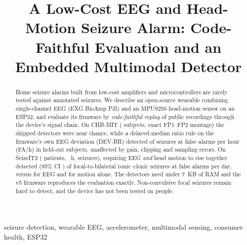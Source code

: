 \documentclass[conference,letterpaper]{IEEEtran}
\begin{document}
\title{A Low-Cost EEG and Head-Motion Seizure Alarm: Code-Faithful Evaluation and an Embedded Multimodal Detector}

\author{
\and
{}
}

\maketitle

\begin{abstract}
Home seizure alarms built from low-cost amplifiers and microcontrollers are rarely tested against annotated seizures. We describe an open-source wearable combining single-channel EEG (EXG BioAmp Pill) and an MPU9250 head-motion sensor on an ESP32, and evaluate its firmware by \emph{code-faithful replay} of public recordings through the device's signal chain. On CHB-MIT (\NSubj{} subjects, exact FP1--FP2 montage) the shipped detectors were near chance, while a delayed-median ratio rule on the firmware's own EEG deviation (DEV-BR) detected \DevASens{} of seizures at \DevAFAh{} false alarms per hour (FA/h) in held-out subjects, unaffected by gain, clipping and sampling errors. On SeizeIT2 (\SNSubj{} patients, \SHours{}~h, \SNSz{} seizures), requiring EEG \emph{and} head motion to rise together detected \SCvASens{} (95\% CI \SCvACI{}) of focal-to-bilateral tonic--clonic seizures at \SCvAFAday{} false alarms per day, versus \SCvEegSens{} for EEG and \SCvMovSens{} for motion alone. The detectors need under 7~KB of RAM and the v5 firmware reproduces the evaluation exactly. Non-convulsive focal seizures remain hard to detect, and the device has not been tested on people.
\end{abstract}

\begin{IEEEkeywords}
seizure detection, wearable EEG, accelerometer, multimodal sensing, consumer health, ESP32
\end{IEEEkeywords}
\end{document}
